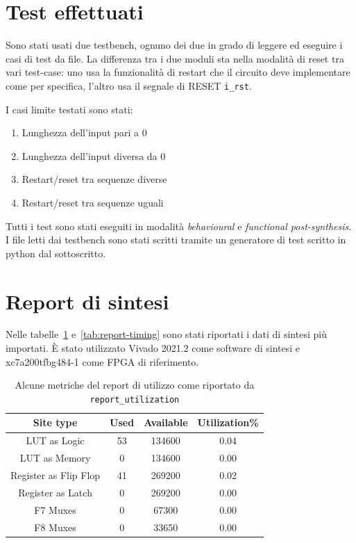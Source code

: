 \documentclass[a4paper,11pt]{article}
\begin{document}
\section{Test effettuati}

Sono stati usati due testbench, ognuno dei due in grado di leggere ed eseguire
i casi di test da file. La differenza tra i due moduli sta nella modalità di
reset tra vari test-case: uno usa la funzionalità di restart che il circuito
deve implementare come per specifica, l'altro usa il segnale di RESET
\texttt{i\_rst}.

I casi limite testati sono stati:

\begin{enumerate}
  \item Lunghezza dell'input pari a 0
  \item Lunghezza dell'input diversa da 0
  \item Restart/reset tra sequenze diverse
  \item Restart/reset tra sequenze uguali
\end{enumerate}

Tutti i test sono stati eseguiti in modalità \textit{behavioural} e
\textit{functional post-synthesis}. I file letti dai testbench sono stati
scritti tramite un generatore di test scritto in python dal sottoscritto.

\section{Report di sintesi}

Nelle tabelle~\ref{tab:report-utilization} e~\ref{tab:report-timing} sono stati
riportati i dati di sintesi più importati. È stato utilizzato Vivado 2021.2 come
software di sintesi e xc7a200tfbg484-1 come FPGA di riferimento.

\begin{table}[H]
  \centering
  \begin{tabular}{c c c c}
    \toprule
    Site type & Used & Available & Utilization\% \\
    \midrule
    LUT as Logic          & 53 & 134600 & 0.04 \\
    LUT as Memory         & 0  & 134600 & 0.00 \\
    Register as Flip Flop & 41 & 269200 & 0.02 \\
    Register as Latch     & 0  & 269200 & 0.00 \\
    F7 Muxes              & 0  & 67300  & 0.00 \\
    F8 Muxes              & 0  & 33650  & 0.00 \\
    \bottomrule
  \end{tabular}
  \caption{Alcune metriche del report di utilizzo come riportato da \texttt{report\_utilization}}%
  \label{tab:report-utilization}
\end{table}
\end{document}
